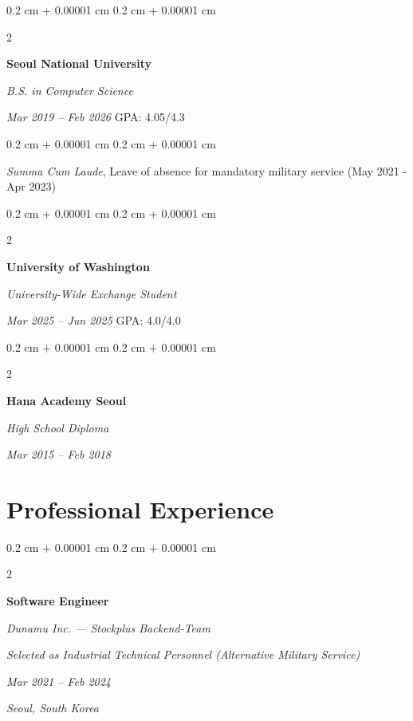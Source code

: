 \documentclass[10pt, letterpaper]{article}
\newenvironment{onecolentry}{
    \begin{adjustwidth}{
        0.2 cm + 0.00001 cm
    }{
        0.2 cm + 0.00001 cm
    }
}{
    \end{adjustwidth}
} %
\newenvironment{twocolentry}[2][]{
    \onecolentry
    \def\secondColumn{#2}
    \setcolumnwidth{\fill, 4.5 cm}
    \begin{paracol}{2}
}{
    \switchcolumn \raggedleft \secondColumn
    \end{paracol}
    \endonecolentry
} %
\begin{document}
        \begin{twocolentry}{    
            \textit{Mar 2019 – Feb 2026}
            \small{GPA: 4.05/4.3}}
            \textbf{Seoul National University}

            \textit{B.S. in Computer Science}
        \end{twocolentry}

        \vspace{0.05 cm}
        \begin{onecolentry}
            \textit{Summa Cum Laude}, Leave of absence for mandatory military service (May 2021 - Apr 2023)
        \end{onecolentry}

        \vspace{0.35 cm}

        \begin{twocolentry}{
            \textit{Mar 2025 – Jun 2025}
            \small{GPA: 4.0/4.0}}
            \textbf{University of Washington}

            \textit{University-Wide Exchange Student}
        \end{twocolentry}

        \vspace{0.35 cm}

        \begin{twocolentry}{
            \textit{Mar 2015 – Feb 2018}}
            \textbf{Hana Academy Seoul}

            \textit{High School Diploma}
        \end{twocolentry}


    \section{Professional Experience}

        \begin{twocolentry}{
        \textit{Mar 2021 – Feb 2024}    
            
        \textit{Seoul, South Korea}}
            \textbf{Software Engineer}
            
            \textit{Dunamu Inc. --- Stockplus Backend-Team}

            \textit{Selected as Industrial Technical Personnel (Alternative Military Service)}
        \end{twocolentry}
\end{document}
